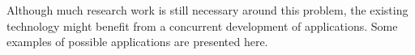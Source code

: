 
Although much research work is still necessary around this
problem, the existing technology might benefit from a
concurrent development of applications. Some examples of
possible applications are presented here.
